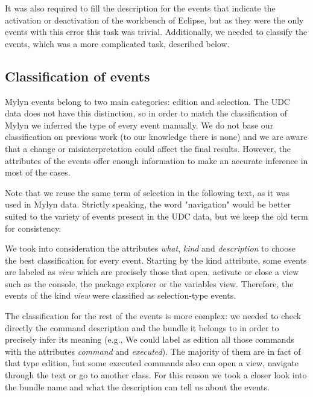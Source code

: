 \documentclass[times]{smrauth}
\begin{document}
It was also required to fill the description for the events that indicate the activation or deactivation of the workbench of Eclipse, but as they were the only events with this error this task was trivial. Additionally, we needed to classify the events, which was a more complicated task, described below.


\subsection{Classification of events}

Mylyn events belong to two main categories: edition and selection. The UDC data does not have this distinction, so in order to match the classification of Mylyn we inferred the type of every event manually. We do not base our classification on previous work (to our knowledge there is none) and we are aware that a change or misinterpretation could affect the final results. However, the attributes of the events offer enough information to make an accurate inference in most of the cases.

Note that we reuse the same term of selection in the following text, as it was used in Mylyn data. Strictly speaking, the word "navigation" would be better suited to the variety of events present in the UDC data, but we keep the old term for consistency.


We took into consideration the attributes \textit{what}, \textit{kind} and \textit{description} to choose the best classification for every event. Starting by the kind attribute, some events are labeled as \textit{view} which are precisely those that open, activate or close a view such as the console, the package explorer or the variables view. Therefore, the events of the kind \textit{view} were classified as selection-type events.

The classification for the rest of the events is more complex: we needed to check directly the command description and the bundle it belongs to in order to precisely infer its meaning (e.g., We could label as edition all those commands with the attributes \textit{command} and \textit{executed}). The majority of them are in fact of that type edition, but some executed commands also can open a view, navigate through the text or go to another class. For this reason we took a closer look into the bundle name and what the description can tell us about the events.
\end{document}
